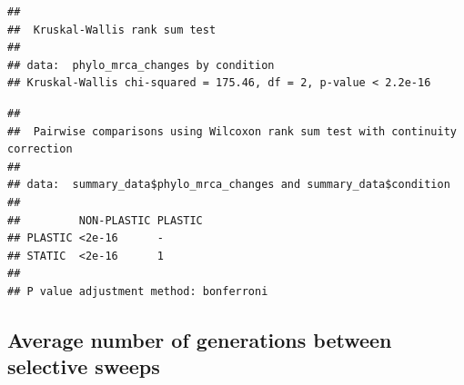 \documentclass[]{book}
\newenvironment{Shaded}{\begin{snugshade}}{\end{snugshade}}
\newcommand{\DataTypeTok}[1]{\textcolor[rgb]{0.13,0.29,0.53}{#1}}
\newcommand{\KeywordTok}[1]{\textcolor[rgb]{0.13,0.29,0.53}{\textbf{#1}}}
\newcommand{\NormalTok}[1]{#1}
\newcommand{\OperatorTok}[1]{\textcolor[rgb]{0.81,0.36,0.00}{\textbf{#1}}}
\newcommand{\StringTok}[1]{\textcolor[rgb]{0.31,0.60,0.02}{#1}}
\begin{document}
\begin{verbatim}
## 
##  Kruskal-Wallis rank sum test
## 
## data:  phylo_mrca_changes by condition
## Kruskal-Wallis chi-squared = 175.46, df = 2, p-value < 2.2e-16
\end{verbatim}

\begin{Shaded}
\end{Shaded}

\begin{verbatim}
## 
##  Pairwise comparisons using Wilcoxon rank sum test with continuity correction 
## 
## data:  summary_data$phylo_mrca_changes and summary_data$condition 
## 
##         NON-PLASTIC PLASTIC
## PLASTIC <2e-16      -      
## STATIC  <2e-16      1      
## 
## P value adjustment method: bonferroni
\end{verbatim}

\hypertarget{average-number-of-generations-between-selective-sweeps}{%
\subsection{Average number of generations between selective sweeps}\label{average-number-of-generations-between-selective-sweeps}}
\end{document}
